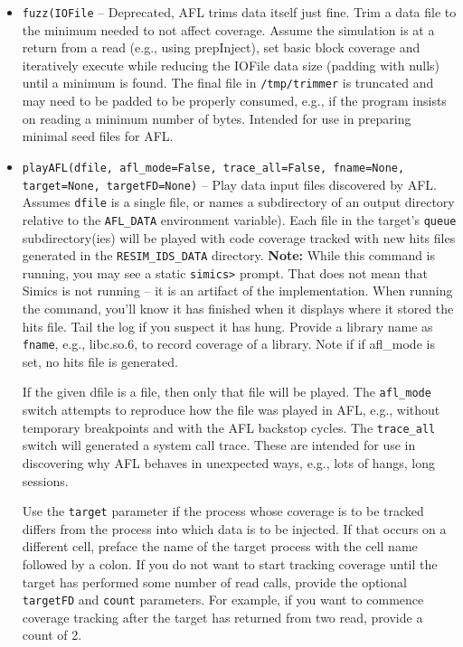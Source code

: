\documentclass[titlepage]{article}
\begin{document}
\begin{itemize}
\item{\tt fuzz(IOFile} -- Deprecated, AFL trims data itself just fine.  Trim a data file to the minimum needed to not affect coverage. Assume the simulation is at 
a return from a read (e.g., using prepInject), set basic block coverage and iteratively execute while reducing the
IOFile data size (padding with nulls) until a minimum is found.  The final file in {\tt /tmp/trimmer} is truncated and may need to be padded to be properly consumed, e.g.,
if the program insists on reading a minimum number of bytes.  Intended for use in preparing minimal seed files for AFL.

\item{\tt playAFL(dfile, afl\_mode=False, trace\_all=False, fname=None, target=None, targetFD=None)} -- Play data input files discovered by AFL.  Assumes {\tt dfile} is a single file, or names a subdirectory of an output directory relative to the {\tt AFL\_DATA} environment variable).  
Each file in the target's {\tt queue} subdirectory(ies) will be played with code coverage tracked with new hits files generated in the {\tt RESIM\_IDS\_DATA} directory.
\textbf{Note:} While this command is running, you may see a static {\tt simics>} prompt.  That does not mean that Simics is not running -- it is an artifact of the implementation.  When running the command, you'll know it has finished when it displays where it stored the hits file.
Tail the log if you suspect it has hung.  Provide a library name as {\tt fname}, e.g., libc.so.6, to record coverage of a library.  Note if if afl\_mode is set, no hits file is generated.

If the given dfile is a file, then only that file will be played.  The {\tt afl\_mode} switch attempts to reproduce how the file was played in AFL, e.g., without temporary
breakpoints and with the AFL backstop cycles.  The {\tt trace\_all} switch will generated a system call trace.  These are intended for use in discovering why AFL
behaves in unexpected ways, e.g., lots of hangs, long sessions.

Use the {\tt target} parameter if the process whose coverage is to be tracked differs from the process into which data is to be injected.  If that occurs
on a different cell, preface the name of the target process with the cell name followed by a colon.  If you do not want to start tracking coverage
until the target has performed some number of read calls, provide the optional {\tt targetFD} and {\tt count} parameters.  For example, if you want to
commence coverage tracking after the target has returned from two read, provide a count of 2.


\end{itemize}
\end{document}
